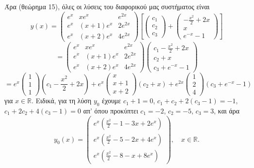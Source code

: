 \documentclass[11pt,a4paper,twoside]{book}
\begin{document}
Άρα (θεώρημα 15), όλες οι λύσεις του διαφορικού μας συστήματος είναι
\[
y(x) = \begin{pmatrix} e^x & xe^x & e^{2x} \\ e^x & (x+1)e^x & 2e^{2x} \\ e^x & (x+2)e^x & 4e^{2x} \end{pmatrix} \left[ \begin{pmatrix} c_1 \\ c_2 \\ c_3 \end{pmatrix} + \begin{pmatrix} -\frac{x^2}{2}+2x \\ x \\ e^{-x}-1 \end{pmatrix} \right]
\]
\[
= \begin{pmatrix} e^x & xe^x & e^{2x} \\ e^x & (x+1)e^x & 2e^{2x} \\ e^x & (x+2)e^x & 4e^{2x} \end{pmatrix} \begin{pmatrix} c_1-\frac{x^2}{2}+2x \\ c_2+x \\ c_3+e^{-x}-1 \end{pmatrix}
\]
\[
= e^x \begin{pmatrix} 1 \\ 1 \\ 1 \end{pmatrix} \left( c_1 - \frac{x^2}{2} + 2x \right) + e^x \begin{pmatrix} x \\ x+1 \\ x+2 \end{pmatrix} (c_2+x) + e^{2x} \begin{pmatrix} 1 \\ 2 \\ 4 \end{pmatrix} (c_3+e^{-x}-1)
\]
για $x \in \mathbb{R}$. Ειδικά, για τη λύση $y_0$ έχουμε
$c_1+1=0$, $c_1+c_2+2(c_3-1)=-1$, $c_1+2c_2+4(c_3-1)=0$
απ' όπου προκύπτει $c_1=-2$, $c_2=-5$, $c_3=3$, και άρα
\[
y_0(x) = \begin{pmatrix} e^x(\frac{x^2}{2}-1-3x+2e^x) \\ e^x(\frac{x^2}{2}-5-2x+4e^x) \\ e^x(\frac{x^2}{2}-8-x+8e^x) \end{pmatrix}, \quad x \in \mathbb{R}.
\]
\end{document}
